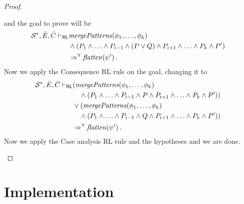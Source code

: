 \documentclass{article}
\newcommand{\RL}{\mathsf{RL}}
\begin{document}
\begin{proof}
\begin{enumerate}
        and the goal to prove will be
        \begin{align*}
            \mathcal{S}^*, \Bar{E}, \Bar{C}
            \vdash_\RL
            & \mathit{mergePatterns}(\phi_1, \ldots, \phi_k)
            \\ & \land (P_1 \land \ldots \land P_{i-1} \land (P \lor Q) \land P_{i+1} \land \ldots \land P_k \land P^\prime) 
            \\ & \Rightarrow^\forall \mathit{flatten}(\psi^\prime) \, .
        \end{align*}
        Now we apply the Consequence RL rule on the goal, changing it to
        \begin{align*}
            \mathcal{S}^*, \Bar{E}, \Bar{C}
            \vdash_\RL
            & (\mathit{mergePatterns}(\phi_1, \ldots, \phi_k)
            \\ & \quad \land (P_1 \land \ldots \land P_{i-1} \land P \land P_{i+1} \land \ldots \land P_k
            \land P^\prime))
            \\ & \lor (\mathit{mergePatterns}(\phi_1, \ldots, \phi_k)
            \\ & \quad \land (P_1 \land \ldots \land P_{i-1} \land Q \land P_{i+1} \land \ldots \land P_k
            \land P^\prime))
            \\ & \Rightarrow^\forall \mathit{flatten}(\psi^\prime) \, .
        \end{align*}
        Now we apply the Case analysis RL rule and the hypotheses and we are done.
\end{enumerate}
\end{proof}

\section{Implementation}




\appendix
\end{document}
